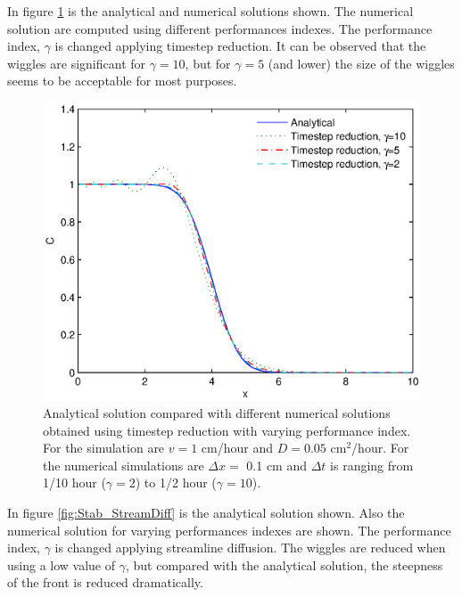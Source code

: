 \documentclass{report}
\begin{document}
In figure \ref{fig:Stab_TimeStepRed} is the analytical and numerical
solutions shown. The numerical solution are computed using
different performances indexes. The performance index, $\gamma$
is changed applying timestep reduction. It can be observed that the
wiggles are significant for $\gamma=10$, but for $\gamma=5$
(and lower) the size of the wiggles seems to be acceptable for
most purposes.


\begin{figure}[htbp]  %
\includegraphics[width=\hsize]{Stab_TimeStepRed.eps}
\caption{Analytical solution compared with different numerical solutions
obtained using timestep reduction with varying performance index.
For the simulation are $v=1$ cm/hour and $D=0.05$ cm$^2$/hour. For the numerical
simulations are $\Delta x=$ 0.1 cm and $\Delta t$  is ranging from 1/10 hour ($\gamma=2$)
to 1/2 hour ($\gamma=10$).}
\label{fig:Stab_TimeStepRed}
\end{figure}

In figure \ref{fig:Stab_StreamDiff} is the analytical solution shown.
Also the numerical solution for varying performances indexes are
shown. The performance index, $\gamma$  is changed applying
streamline diffusion. The wiggles are reduced when using a low value
of $\gamma$, but compared with the analytical solution, the
steepness of the front is reduced dramatically.
\end{document}
